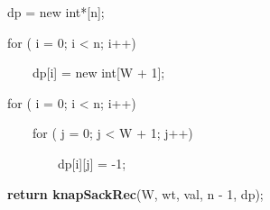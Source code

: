 \documentclass[letterpaper]{article}
\begin{document}
\begin{multicols}{2}
{\color[rgb]{0.2509804,0.25882354,0.30588236}
\ \ \ \ dp = new int*[n];}

{\color[rgb]{0.2509804,0.25882354,0.30588236}
\ \ \ \ for ( i = 0; i {\textless} n; i++)}

{\color[rgb]{0.2509804,0.25882354,0.30588236}
\ \ \ \ \ \ \ \ dp[i] = new int[W + 1];}


\bigskip

{\color[rgb]{0.2509804,0.25882354,0.30588236}
\ \ \ \ for ( i = 0; i {\textless} n; i++)}

{\color[rgb]{0.2509804,0.25882354,0.30588236}
\ \ \ \ \ \ \ \ for ( j = 0; j {\textless} W + 1; j++)}

{\color[rgb]{0.2509804,0.25882354,0.30588236}
\ \ \ \ \ \ \ \ \ \ \ \ dp[i][j] = -1;}

\textcolor[rgb]{0.2509804,0.25882354,0.30588236}{\ \ \ \ }\textbf{\textcolor[rgb]{0.2509804,0.25882354,0.30588236}{return
knapSackRec}}\textcolor[rgb]{0.2509804,0.25882354,0.30588236}{(W, wt, val, n - 1, dp);}


\bigskip
\end{multicols}
\begin{multicols}{2}

\bigskip
\end{multicols}
\end{document}
